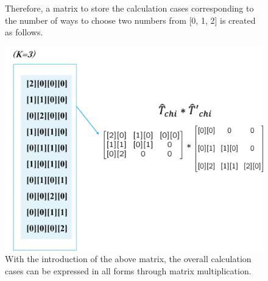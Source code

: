 \documentclass{article}
\begin{document}
\begin{spacing}{1.5}
\begin{figure}[H]
  \caption{Therefore, a matrix to store the calculation cases corresponding to the number of ways to choose two numbers from [0, 1, 2] is created as follows.}
\end{figure}
\begin{figure}[H]
  \centerline{\includegraphics[width=12cm]{TexFigure/Tmat3.png}}
  \caption{With the introduction of the above matrix, the overall calculation cases can be expressed in all forms through matrix multiplication.}
\end{figure}

\pagebreak

\end{spacing}
\end{document}

